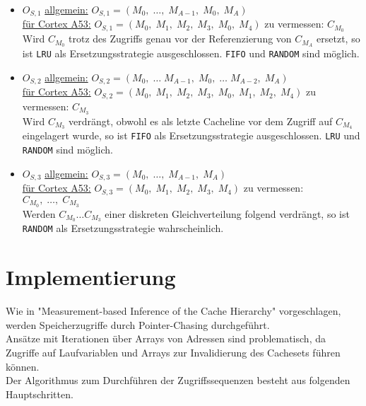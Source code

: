 \documentclass[]{scrbook}
\begin{document}
\begin{itemize}
	\item $O_{S,1}$ \quad \underline{allgemein:} $O_{S,1} = (M_0,\; \dots,\; M_{A-1},\; M_0,\; M_A)$\\
	\underline{für Cortex A53:} $O_{S,1} = (M_0,\; M_1,\; M_2,\; M_3,\; M_0,\; M_4)$ \quad zu vermessen: $C_{M_0}$\\
	Wird $C_{M_0}$ trotz des Zugriffs genau vor der Referenzierung von $C_{M_A}$ ersetzt, so ist \texttt{LRU} als Ersetzungsstrategie ausgeschlossen. \texttt{FIFO} und \texttt{RANDOM} sind möglich.\\
		
	\item $O_{S,2}$ \quad \underline{allgemein:} $O_{S,2} = (M_0,\; \dots\; M_{A-1},\; M_0,\; \dots \; M_{A-2},\; M_A)$\\
	\underline{für Cortex A53:} $O_{S,2} = (M_0,\; M_1,\; M_2,\; M_3,\; M_0,\; M_1,\; M_2,\; M_4)$ \quad zu vermessen: $C_{M_3}$\\
	Wird $C_{M_{3}}$ verdrängt, obwohl es als letzte Cacheline vor dem Zugriff auf $C_{M_4}$ eingelagert wurde, so ist \texttt{FIFO} als Ersetzungsstrategie ausgeschlossen. \texttt{LRU} und \texttt{RANDOM} sind möglich.\\
	
	\item $O_{S,3}$ \quad \underline{allgemein:} $O_{S,3} = (M_0,\; \dots,\; M_{A-1},\; M_A)$\\
	\underline{für Cortex A53:} $O_{S,3} = (M_0,\; M_1,\; M_2,\; M_3,\; M_4)$ \quad zu vermessen: $C_{M_0},\; \dots,\; C_{M_{3}}$ \\
	Werden $C_{M_0} \dots C_{M_3}$ einer diskreten Gleichverteilung folgend verdrängt, so ist \texttt{RANDOM} als Ersetzungsstrategie wahrscheinlich. \\

\end{itemize}

\section{Implementierung}

Wie in "Measurement-based Inference of the Cache Hierarchy" \cite[S.\,54]{abel_ma} vorgeschlagen, werden Speicherzugriffe durch Pointer-Chasing durchgeführt.
\\
Ansätze mit Iterationen über Arrays von Adressen sind problematisch, da Zugriffe auf Laufvariablen und Arrays zur Invalidierung des Cachesets führen können.
\\
Der Algorithmus zum Durchführen der Zugriffssequenzen besteht aus folgenden Hauptschritten.
\end{document}
